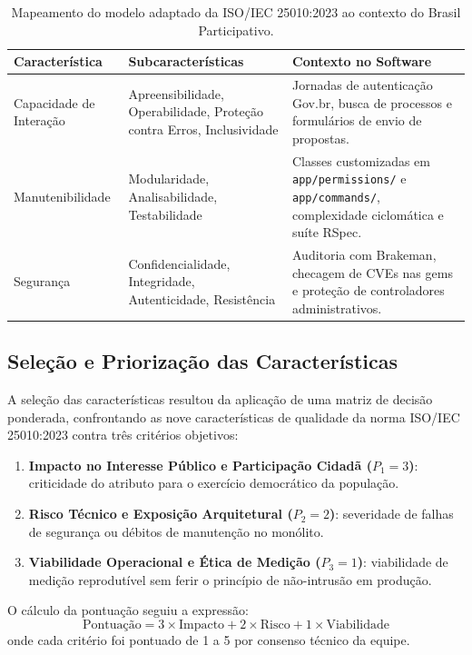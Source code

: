\documentclass[journal]{IEEEtran}
\begin{document}
\begin{table}[!t]
\centering
\caption{Mapeamento do modelo adaptado da ISO/IEC 25010:2023 ao contexto do Brasil Participativo.}
\label{tab:modelo_square}
\small
\begin{tabular}{@{}p{} p{} p{}@{}}
\toprule
\textbf{Característica} & \textbf{Subcaracterísticas} & \textbf{Contexto no Software} \\
\midrule
Capacidade de Interação & Apreensibilidade, Operabilidade, Proteção contra Erros, Inclusividade & Jornadas de autenticação Gov.br, busca de processos e formulários de envio de propostas. \\
\midrule
Manutenibilidade & Modularidade, Analisabilidade, Testabilidade & Classes customizadas em \texttt{app/permissions/} e \texttt{app/commands/}, complexidade ciclomática e suíte RSpec. \\
\midrule
Segurança & Confidencialidade, Integridade, Autenticidade, Resistência & Auditoria com Brakeman, checagem de CVEs nas gems e proteção de controladores administrativos. \\
\bottomrule
\end{tabular}
\end{table}

\subsection{Seleção e Priorização das Características}
\label{sec:priorizacao}

A seleção das características resultou da aplicação de uma matriz de decisão ponderada, confrontando as nove características de qualidade da norma ISO/IEC 25010:2023 contra três critérios objetivos:
\begin{enumerate}
    \item \textbf{Impacto no Interesse Público e Participação Cidadã ($P_1 = 3$)}: criticidade do atributo para o exercício democrático da população.
    \item \textbf{Risco Técnico e Exposição Arquitetural ($P_2 = 2$)}: severidade de falhas de segurança ou débitos de manutenção no monólito.
    \item \textbf{Viabilidade Operacional e Ética de Medição ($P_3 = 1$)}: viabilidade de medição reprodutível sem ferir o princípio de não-intrusão em produção.
\end{enumerate}

O cálculo da pontuação seguiu a expressão:
\begin{equation}
\text{Pontuação} = 3 \times \text{Impacto} + 2 \times \text{Risco} + 1 \times \text{Viabilidade}
\label{eq:priorizacao}
\end{equation}
onde cada critério foi pontuado de 1 a 5 por consenso técnico da equipe. 
\end{document}
